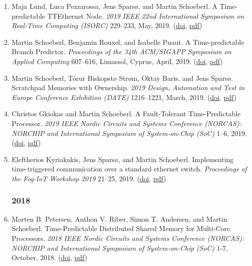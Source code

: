 \begin{enumerate}
\item Maja Lund, Luca Pezzarossa, Jens Spars{\o}, and Martin Schoeberl.
 A Time-predictable TTEthernet Node.
 \emph{2019 IEEE 22nd International Symposium on Real-Time Computing (ISORC)} 229--233, May, 2019.
(\href{http://dx.doi.org/10.1109/ISORC.2019.00048}{doi}, \href{https://www.jopdesign.com/doc/ttenode-short.pdf}{pdf})

\item Martin Schoeberl, Benjamin Rouxel, and Isabelle Puaut.
 A Time-predictable Branch Predictor.
 \emph{Proceedings of the 34th ACM/SIGAPP Symposium on Applied Computing} 607--616, Limassol, Cyprus, April, 2019.
(\href{http://dx.doi.org/10.1145/3297280.3297337}{doi}, \href{https://www.jopdesign.com/doc/branchpred.pdf}{pdf})

\item Martin Schoeberl, T{\'o}rur Biskopst{\o} Str{\o}m, Oktay Baris, and Jens Spars{\o}.
 Scratchpad Memories with Ownership.
 \emph{2019 Design, Automation and Test in Europe Conference Exhibition (DATE)} 1216--1221, March, 2019.
(\href{http://dx.doi.org/10.23919/DATE.2019.8714926}{doi}, \href{https://www.jopdesign.com/doc/ownspm.pdf}{pdf})

\item Christos Gkiokas and Martin Schoeberl.
 A Fault-Tolerant Time-Predictable Processor.
 \emph{2019 IEEE Nordic Circuits and Systems Conference (NORCAS): NORCHIP and International Symposium of System-on-Chip (SoC)} 1--6, 2019.
(\href{http://dx.doi.org/10.1109/NORCHIP.2019.8906947}{doi}, \href{https://www.jopdesign.com/doc/lockpat.pdf}{pdf})

\item Eleftherios Kyriakakis, Jens Spars{\o}, and Martin Schoeberl.
 Implementing time-triggered communication over a standard ethernet switch.
 \emph{Proceedings of the Fog-IoT Workshop 2019} 21--25, 2019.
(\href{http://dx.doi.org/10.1145/3313150.3313221}{doi}, \href{https://www.jopdesign.com/doc/poorman-tte.pdf}{pdf})


\subsubsection*{2018}

\item Morten B. Petersen, Anthon V. Riber, Simon T. Andersen, and Martin Schoeberl.
 Time-Predictable Distributed Shared Memory for Multi-Core Processors.
 \emph{2018 IEEE Nordic Circuits and Systems Conference (NORCAS): NORCHIP and International Symposium of System-on-Chip (SoC)} 1-7, October, 2018.
(\href{http://dx.doi.org/10.1109/NORCHIP.2018.8573463}{doi}, \href{http://www.jopdesign.com/doc/tpdistmen.pdf}{pdf})


\end{enumerate}

